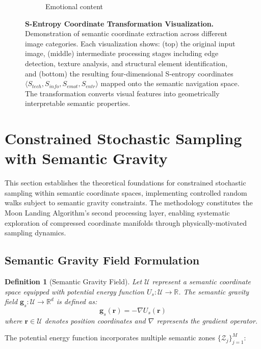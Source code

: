 \documentclass[11pt,a4paper]{article}
\newtheorem{definition}[theorem]{Definition}
\begin{document}
\begin{figure}[htbp]
\begin{subfigure}{0.32\textwidth}
\caption{Emotional content}
\end{subfigure}
\caption{\textbf{S-Entropy Coordinate Transformation Visualization.} Demonstration of semantic coordinate extraction across different image categories. Each visualization shows: (top) the original input image, (middle) intermediate processing stages including edge detection, texture analysis, and structural element identification, and (bottom) the resulting four-dimensional S-entropy coordinates $\langle S_{tech}, S_{info}, S_{emot}, S_{entr} \rangle$ mapped onto the semantic navigation space. The transformation converts visual features into geometrically interpretable semantic properties.}
\label{fig:s-entropy-transformation}
\end{figure}

\section{Constrained Stochastic Sampling with Semantic Gravity}
\label{sec:constrained-sampling}

This section establishes the theoretical foundations for constrained stochastic sampling within semantic coordinate spaces, implementing controlled random walks subject to semantic gravity constraints. The methodology constitutes the Moon Landing Algorithm's second processing layer, enabling systematic exploration of compressed coordinate manifolds through physically-motivated sampling dynamics.

\subsection{Semantic Gravity Field Formulation}

\begin{definition}[Semantic Gravity Field]
Let $\mathcal{U}$ represent a semantic coordinate space equipped with potential energy function $U_s: \mathcal{U} \to \mathbb{R}$. The semantic gravity field $\mathbf{g}_s: \mathcal{U} \to \mathbb{R}^d$ is defined as:
\begin{equation}
\mathbf{g}_s(\mathbf{r}) = -\nabla U_s(\mathbf{r})
\label{eq:semantic-gravity}
\end{equation}
where $\mathbf{r} \in \mathcal{U}$ denotes position coordinates and $\nabla$ represents the gradient operator.
\end{definition}

The potential energy function incorporates multiple semantic zones $\{\mathcal{Z}_j\}_{j=1}^M$:
\end{document}
